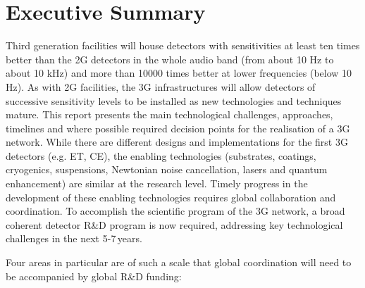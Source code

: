 \chapter{Executive Summary}
\label{sec:ExecSummary}
\renewcommand*{\thepage}{ES\roman{page}}
Third generation facilities will house detectors with sensitivities at least ten times better than the 2G detectors in the whole audio band (from about 10 Hz to about 10 kHz) and more than 10000 times better at lower frequencies (below 10 Hz).
As with 2G facilities, the 3G infrastructures will allow detectors of successive sensitivity levels  %
to be installed as new technologies and techniques mature.  This report presents the main technological challenges, approaches, timelines and where possible required decision points for the realisation of a 3G network. While there are different designs and implementations for the first 3G detectors (e.g. ET, CE), the enabling technologies (substrates, coatings, cryogenics, suspensions, Newtonian noise cancellation, lasers and quantum enhancement) are similar at the research level.  Timely progress in the development of these enabling technologies requires global collaboration and coordination. To accomplish the scientific program of the 3G network, a broad coherent detector R\&D program is now required, addressing key technological challenges in the next 5-7\,years.

Four areas in particular are of such a scale that global coordination will need to be accompanied by global R\&D funding: 


